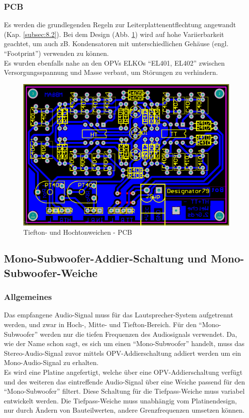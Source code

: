 \newpage
\subsubsection{PCB}\label{subsec:5.4.3}
Es werden die grundlegenden Regeln zur Leiterplattenentflechtung angewandt (Kap. \ref{subsec:8.2}).
Bei dem Design (Abb. \ref{fig:5.4.3.1}) wird auf hohe Variierbarkeit geachtet, um auch zB. Kondensatoren mit unterschiedlichen Gehäuse (engl. \enquote{Footprint}) verwenden zu können.\\
Es wurden ebenfalls nahe an den OPVs ELKOs \enquote{EL401, EL402} zwischen Versorgungsspannung und Masse verbaut, um Störungen zu verhindern.
\begin{figure} [H]
	\centering	
	\includegraphics[width=1\textwidth]{img/Print4/4_TTuHTWeiche-PCB.PNG}
	\caption{Tiefton- und Hochtonweichen - PCB}
	\label {fig:5.4.3.1}
\end{figure}


\newpage
\subsection*{Mono-Subwoofer-Addier-Schaltung und Mono-Subwoofer-Weiche}\label{sec:5.5}
\subsubsection{Allgemeines}\label{susec:5.5.1}
Das empfangene Audio-Signal muss für das Lautsprecher-System aufgetrennt werden, und zwar in Hoch-, Mitte- und Tiefton-Bereich.
Für den \enquote{Mono-Subwoofer} werden nur die tiefen Frequenzen des Audiosignals verwendet.
Da, wie der Name schon sagt, es sich um einen \enquote{Mono-Subwoofer} handelt, muss das Stereo-Audio-Signal zuvor mittels OPV-Addierschaltung addiert werden um ein Mono-Audio-Signal zu erhalten.\\
Es wird eine Platine angefertigt, welche über eine OPV-Addierschaltung verfügt und des weiteren das eintreffende Audio-Signal über eine Weiche passend für den \enquote{Mono-Subwoofer} filtert.
Diese Schaltung für die Tiefpass-Weiche muss variabel entwickelt werden. Die Tiefpass-Weiche muss unabhängig vom Platinendesign, nur durch Ändern von Bauteilwerten, andere Grenzfrequenzen umsetzen können.

